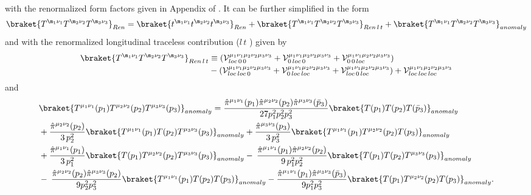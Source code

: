\documentclass[a4paper,11pt,openright,twoside]{book}
\let\n=\nu      \let\x=\xi     \let\p=\pi      \let\r=\rho
\numberwithin{equation}{section}
\begin{document}
{{\begin{align}
\end{align}
with the renormalized form factors given in Appendix of \cite{Coriano:2018bsy}. It can be further simplified in the form 
\begin{align}
	\braket{T^{\m_1\n_1}T^{\m_2\n_2}T^{\m_3\n_3}}_{Ren}= \braket{t^{\m_1\n_1} t^{\m_2\n_2} t^{\m_3\n_3}}_{Ren} + 
	\braket{T^{\m_1\n_1}T^{\m_2\n_2}T^{\m_3\n_3}}_{Ren\, l\,t} + \braket{T^{\m_1\n_1}T^{\m_2\n_2}T^{\m_3\n_3}}_{anomaly}\notag\\
\end{align}
and with the renormalized longitudinal traceless contribution ($l \, t$ ) given by 
\begin{align}
	\braket{ T^{\m_1\n_1}T^{\m_2\n_2}T^{\m_3\n_3}}_{Ren\,l \, t}&\equiv\left(\mathcal{V}^{\mu_1\nu_1\mu_2\nu_2\mu_3\nu_3}_{loc\,0\, 0} + \mathcal{V}^{\mu_1\nu_1\mu_2\nu_2\mu_3\nu_3}_{0\, loc\, 0}  + \mathcal{V}^{\mu_1\nu_1\mu_2\nu_2\mu_3\nu_3}_{0\, 0 \, loc} \right) \notag\\
	&-
	\left(\mathcal{V}^{\mu_1\nu_1\mu_2\nu_2\mu_3\nu_3}_{loc\,loc\, 0} + \mathcal{V}^{\mu_1\nu_1\mu_2\nu_2\mu_3\nu_3}_{0\, loc\, loc}  + \mathcal{V}^{\mu_1\nu_1\mu_2\nu_2\mu_3\nu_3}_{loc\, 0 \, loc} \right) + \mathcal{V}^{\mu_1\nu_1\mu_2\nu_2\mu_3\nu_3}_{loc\,loc\,loc}
\end{align}
and 
\begin{align}
	\label{expans2}
	& \braket{T^{\mu_1 \nu_1}({p}_1) T^{\mu_2 \nu_2}({p}_2) T^{\mu_3 \nu_3}({p}_3) }_{anomaly} = \frac{\hat\pi^{\mu_1 \nu_1}({p}_1)\hat\pi^{\mu_2 \nu_2}({p}_2) \hat\pi^{\mu_3 \nu_3}(\bar{p}_3)}{27 p_1^2 p_2^2 p_3^2}\braket{ T({p}_1)T({p}_2)T(\bar{p}_3)}_{anomaly} \notag\\
	& + \frac{\hat\pi^{\mu_2 \nu_2}({p}_2)}{3\, p_2^2} \braket{ T^{\mu_1 \nu_1}({p}_1) T({p}_2) T^{\mu_3 \nu_3}({p}_3)}_{anomaly} + \frac{\hat\pi^{\mu_3 \nu_3}({p}_3)}{3\, p_3^2} \braket{ T^{\mu_1 \nu_1}({p}_1) T^{\mu_2 \nu_2}({p}_2)  T({p}_3)}_{anomaly} \notag\\
	&+ \frac{\hat\pi^{\mu_1 \nu_1}({p}_1)}{3\, p_1^2} \braket{T({p}_1) T^{\mu_2 \nu_2}({p}_2) T^{\mu_3 \nu_3}({p}_3)}_{anomaly} - \: \frac{\hat\pi^{\mu_1 \nu_1}({p}_1) \hat\pi^{\mu_2 \nu_2}({p}_2)}{9\, p_1^2 p_2^2}\braket{ T({p}_1)T({p}_2)T^{\mu_3 \nu_3}({p}_3)}_{anomaly}  \notag\\
	&- \: \frac{\hat\pi^{\mu_2 \nu_2}({p}_2) \hat\pi^{\mu_3 \nu_3}({p}_2)}{9 p_2^2 p_3^2}\braket{T^{\mu_1 \nu_1}({p}_1)T(p_2)T({p}_3)}_{anomaly} - \frac{\hat\pi^{\mu_1 \nu_1}({p}_1)\hat \pi^{\mu_3 \nu_3}(\bar{p}_3)}{9 p_1^2 p_3^2}\braket{ T({p}_1) T^{\mu_2 \nu_2}({p}_2)T({p}_3)}_{anomaly}    .

\end{align}}}
\end{document}
